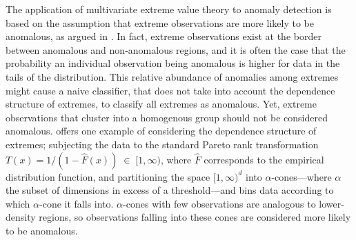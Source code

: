 The application of multivariate extreme value theory to anomaly detection is 
    based on the  assumption that extreme observations are more likely to be 
    anomalous, as argued in \cite{goix2017}. In fact, extreme observations 
    exist at the border between anomalous and non-anomalous regions, and it is 
    often the case that the probability an individual observation being 
    anomalous is higher for data in the tails of the distribution.
    This relative abundance of anomalies among extremes might cause a naive 
    classifier, that does not take into account the dependence structure of 
    extremes, to classify all extremes as anomalous. Yet, extreme observations 
    that cluster into a homogenous group should not be considered anomalous.
    \cite{goix2017} offers one example of considering the dependence structure 
    of extremes; subjecting the data to the standard Pareto rank transformation 
    $T(x) = 1/(1 - \hat{F}(x))\;\in\;[1,\infty)$, where $\hat{F}$ corresponds 
    to the empirical distribution function, 
    and partitioning the space $[1,\infty)^d$ into $\alpha$-cones---where 
    $\alpha$ the subset of dimensions in excess of a threshold---and bins 
    data according to which $\alpha$-cone it falls into.  $\alpha$-cones with 
    few observations are analogous to lower-density regions, so observations 
    falling into these cones are considered more likely to be anomalous.

